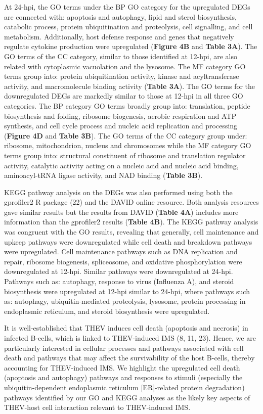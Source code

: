 \documentclass[
]{article}
\begin{document}
At 24-hpi, the GO terms under the BP GO category for the upregulated
DEGs are connected with: apoptosis and autophagy, lipid and sterol
biosynthesis, catabolic process, protein ubiquitination and proteolysis,
cell signalling, and cell metabolism. Additionally, host defense
response and genes that negatively regulate cytokine production were
upregulated (\textbf{Figure 4B} and \textbf{Table 3A}). The GO terms of
the CC category, similar to those identified at 12-hpi, are also related
with cytoplasmic vacuolation and the lysosome. The MF category GO terms
group into: protein ubiquitination activity, kinase and acyltransferase
activity, and macromolecule binding activity (\textbf{Table 3A}). The GO
terms for the downregulated DEGs are markedly similar to those at 12-hpi
in all three GO categories. The BP category GO terms broadly group into:
translation, peptide biosynthesis and folding, ribosome biogenesis,
aerobic respiration and ATP synthesis, and cell cycle process and
nucleic acid replication and processing (\textbf{Figure 4D} and
\textbf{Table 3B}). The GO terms of the CC category group under:
ribosome, mitochondrion, nucleus and chromosomes while the MF category
GO terms group into: structural constituent of ribosome and translation
regulator activity, catalytic activity acting on a nucleic acid and
nucleic acid binding, aminoacyl-tRNA ligase activity, and NAD binding
(\textbf{Table 3B}).

KEGG pathway analysis on the DEGs was also performed using both the
gprofiler2 R package (22) and the DAVID online resource. Both analysis
resources gave similar results but the results from DAVID (\textbf{Table
4A}) includes more information than the gprofiler2 results
(\textbf{Table 4B}). The KEGG pathway analysis was congruent with the GO
results, revealing that generally, cell maintenance and upkeep pathways
were downregulated while cell death and breakdown pathways were
upregulated. Cell maintenance pathways such as DNA replication and
repair, ribosome biogenesis, spliceosome, and oxidative phosphorylation
were downregulated at 12-hpi. Similar pathways were downregulated at
24-hpi. Pathways such as: autophagy, response to virus (Influenza A),
and steroid biosynthesis were upregulated at 12-hpi similar to 24-hpi,
where pathways such as: autophagy, ubiquitin-mediated proteolysis,
lysosome, protein processing in endoplasmic reticulum, and steroid
biosynthesis were upregulated.

It is well-established that THEV induces cell death (apoptosis and
necrosis) in infected B-cells, which is linked to THEV-induced IMS (8,
11, 23). Hence, we are particularly interested in cellular processes and
pathways associated with cell death and pathways that may affect the
survivability of the host B-cells, thereby accounting for THEV-induced
IMS. We highlight the upregulated cell death (apoptosis and autophagy)
pathways and responses to stimuli (especially the ubiquitin-dependent
endoplasmic reticulum {[}ER{]}-related protein degradation) pathways
identified by our GO and KEGG analyses as the likely key aspects of
THEV-host cell interaction relevant to THEV-induced IMS.
\end{document}
